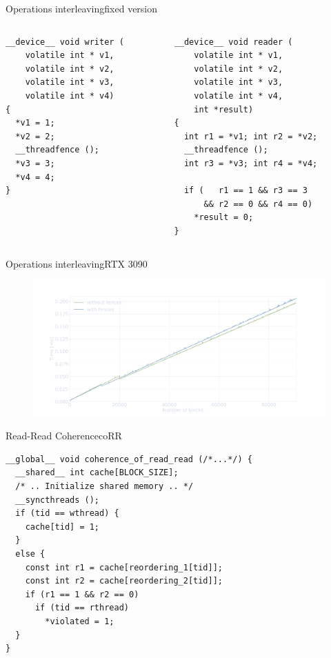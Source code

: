 \documentclass[aspectratio=169,compress]{beamer}
\begin{document}
\begin{frame}[fragile]{Operations interleaving}{fixed version}
\begin{columns}[T]
	\begin{column}{0.4\textwidth}
\begin{lstlisting}[]
__device__ void writer (
    volatile int * v1,
    volatile int * v2,
    volatile int * v3,
    volatile int * v4)
{
  *v1 = 1;
  *v2 = 2;
  __threadfence ();
  *v3 = 3;
  *v4 = 4;
}
\end{lstlisting}
\end{column}

\begin{column}{0.45\textwidth}
\begin{lstlisting}[]
__device__ void reader (
    volatile int * v1,
    volatile int * v2,
    volatile int * v3,
    volatile int * v4,
    int *result)
{
  int r1 = *v1; int r2 = *v2;
  __threadfence ();
  int r3 = *v3; int r4 = *v4;

  if (   r1 == 1 && r3 == 3 
      && r2 == 0 && r4 == 0)
    *result = 0;
}
\end{lstlisting}
			\end{column}
	\end{columns}
\end{frame}


\begin{frame}[fragile]{Operations interleaving}{RTX 3090}
\centering
	\begin{figure}
		\includegraphics[width=\textwidth]{interleaved_fence_perf.pdf}
	\end{figure}
\end{frame}


\begin{frame}[fragile]{Read-Read Coherence}{coRR}
\centering
\begin{lstlisting}
__global__ void coherence_of_read_read (/*...*/) {
  __shared__ int cache[BLOCK_SIZE];
  /* .. Initialize shared memory .. */
  __syncthreads ();
  if (tid == wthread) {
    cache[tid] = 1;
  }
  else {
    const int r1 = cache[reordering_1[tid]]; 
    const int r2 = cache[reordering_2[tid]];
    if (r1 == 1 && r2 == 0) 
      if (tid == rthread) 
        *violated = 1;
  }
}     
\end{lstlisting}
\end{frame}
\end{document}
